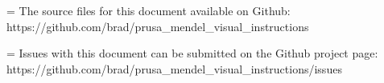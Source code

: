 	\vspace{\baselineskip}
	\vspace{\baselineskip}
	\vspace{\baselineskip}
	\vspace{\baselineskip}

	\noindent
	\hangindent=\parindent
	The source files for this document available on Github:\\
		https://github.com/brad/prusa\_mendel\_visual\_instructions\vspace{\baselineskip}

	\noindent
	\hangindent=\parindent
	Issues with this document can be submitted on the Github project page:\\
		https://github.com/brad/prusa\_mendel\_visual\_instructions/issues
